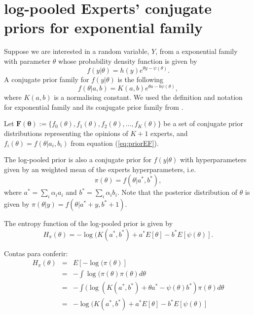 \documentclass[a4paper, notitlepage, 11pt]{article}
\begin{document}
\section*{log-pooled Experts' conjugate priors for exponential family}

Suppose we are interested in a random variable, $Y$, from a exponential family with parameter $\theta$ whose probability density function is given by
\begin{equation} \label{eq:exponentialfamily}
f(y|\theta) = h(y) e^{\theta y - \psi(\theta)}.
\end{equation}
A conjugate prior family for $f(y|\theta)$ is the following
\begin{equation} \label{eq:priorEF}
f(\theta | a, b) = K(a,b) e^{\theta a - b \psi(\theta)},
\end{equation}
where $K(a,b)$ is a normalising constant. We used the definition and notation for exponential family and its conjugate prior family from \citet[chapter 3]{robert2001bayesian}.

Let $\mathbf{F(\theta)} := \{f_0(\theta), f_1(\theta), f_2(\theta), \ldots, f_K(\theta)\}$ be a set of conjugate prior distributions representing the opinions of $K+1$ experts, and $f_i(\theta) = f(\theta | a_i, b_i)$ from equation (\ref{eq:priorEF}).

The log-pooled prior is also a conjugate prior for $f(y|\theta)$ with hyperparameters given by an weighted mean of the experts hyperparameters, i.e.
\begin{equation}
\pi(\theta) = f(\theta | a^*, b^*),
\end{equation}
where $a^* = \sum_{i} \alpha_i a_i$ and $b^* = \sum_{i} \alpha_i b_i$. Note that the posterior distribution of $\theta$ is given by $\pi(\theta | y) = f(\theta | a^* + y, b^* + 1)$.

The entropy function of the log-pooled prior is given by
\begin{equation} \label{eq:entropypriorEF}
H_\pi(\theta) = - \log(K(a^*, b^*) + a^*  E[\theta]-  b^*  E[\psi(\theta)].
\end{equation}

Contas para conferir:
\begin{eqnarray*} 
H_\pi(\theta) & = & E[-\log(\pi(\theta)] \\
              & = & - \int \log(\pi(\theta) \pi(\theta) d\theta \\
              & = & - \int (\log(K(a^*, b^*) + \theta a^* - \psi(\theta) b^*) \pi(\theta) d\theta \\
              & = & - \log(K(a^*, b^*) + a^*  E[\theta]-  b^*  E[\psi(\theta)]
\end{eqnarray*}
\end{document}
